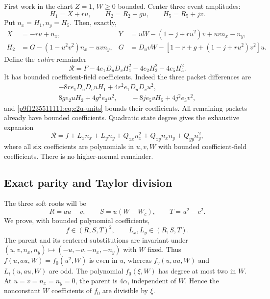 First work in the chart $Z=1$, $W\ge0$ bounded. Center three event amplitudes:
\[
 H_1=X+ru,\qquad H_2=R_2-gu,\qquad H_5=R_5+jv.
\]
Put $n_x=H_1,n_y=H_5$. Then, exactly,
\begin{align}
X&=-ru+n_x,&
Y&=uW-(1-j+ru^2)v+uvn_x-n_y,\label{p9f1235511111:eq:c2u-normal-sub}\\
H_2&=G-(1-u^2v^2)n_x-uvn_y,&
G&=D_uvW-[1-r+g+(1-j+ru^2)v^2]u.\label{p9f1235511111:eq:c2u-current}
\end{align}
Define the \emph{entire} remainder
\begin{equation}
\mathcal R=F-4e_1D_uD_vH_1^2-4e_2H_2^2-4e_5H_5^2.
\label{p9f1235511111:eq:c2u-remainder}
\end{equation}
It has bounded coefficient-field coefficients. Indeed the three packet
differences are
\begin{gather*}
-8re_1D_uD_vuH_1+4r^2e_1D_uD_vu^2,\\
8ge_2uH_2+4g^2e_2u^2,\qquad
-8je_5vH_5+4j^2e_5v^2,
\end{gather*}
and \eqref{p9f1235511111:eq:c2u-units} bounds their coefficients. All remaining
packets already have bounded coefficients. Quadratic state degree gives
the exhaustive expansion
\begin{equation}
\mathcal R=f+L_xn_x+L_yn_y
 +Q_{xx}n_x^2+Q_{xy}n_xn_y+Q_{yy}n_y^2,
\label{p9f1235511111:eq:c2u-normal-expansion}
\end{equation}
where all six coefficients are polynomials in $u,v,W$ with bounded
coefficient-field coefficients. There is no higher-normal remainder.

\subsection{Exact parity and Taylor division}
The three soft roots will be
\begin{equation}
 R=au-v,\qquad S=u(W-W_c),\qquad T=u^2-c^2.
\label{p9f1235511111:eq:c2u-soft}
\end{equation}
We prove, with bounded polynomial coefficients,
\begin{equation}
 f\in(R,S,T)^2,\qquad L_x,L_y\in(R,S,T).
\label{p9f1235511111:eq:c2u-membership}
\end{equation}
The parent and its centered substitutions are invariant under
$(u,v,n_x,n_y)\mapsto(-u,-v,-n_x,-n_y)$ with $W$ fixed.
Thus $f(u,au,W)=f_0(u^2,W)$ is even in $u$, whereas
$f_v(u,au,W)$ and $L_i(u,au,W)$ are odd. The polynomial $f_0(\xi,W)$
has degree at most two in $W$. At $u=v=n_x=n_y=0$, the parent is
$4\alpha$, independent of $W$. Hence the nonconstant $W$ coefficients
of $f_0$ are divisible by $\xi$.

